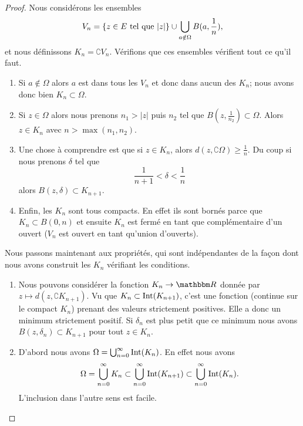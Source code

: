 \begin{proof}
    Nous considérons les ensembles
    \begin{equation}
        V_n=\{ z\in E\text{ tel que } | z | \}\cup\bigcup_{a\notin\Omega}B(a,\frac{1}{ n }),
    \end{equation}
    et nous définissons \( K_n=\complement V_n\). Vérifions que ces ensembles vérifient tout ce qu'il faut.
    \begin{enumerate}
        \item
            Si \( a\notin\Omega\) alors \( a\) est dans tous les \( V_n\) et donc dans aucun des \( K_n\); nous avons donc bien \( K_n\subset\Omega\).
        \item
            Si \( z\in \Omega\) alors nous prenons \( n_1>| z |\) puis \( n_2\) tel que \( B(z,\frac{1}{ n_2 })\subset \Omega\). Alors \( z\in K_n\) avec \( n>\max(n_1,n_2)\).
        \item
            Une chose à comprendre est que si \( z\in K_n\), alors \( d(z,\complement \Omega)\geq \frac{1}{ n }\). Du coup si nous prenons \( \delta\) tel que
            \begin{equation}
                \frac{1}{ n+1 }<\delta<\frac{1}{ n }
            \end{equation}
            alors \( B(z,\delta)\subset K_{n+1}\).
        \item
            Enfin, les \( K_n\) sont tous compacts. En effet ils sont bornés parce que \( K_n\subset B(0,n)\) et ensuite \( K_n\) est fermé en tant que complémentaire d'un ouvert (\( V_n\) est ouvert en tant qu'union d'ouverts).
    \end{enumerate}

    Nous passons maintenant aux propriétés, qui sont indépendantes de la façon dont nous avons construit les \( K_n\) vérifiant les conditions.
    \begin{enumerate}
        \item

            Nous pouvons considérer la fonction \( K_n\to \eR\) donnée par \( z\mapsto d(z,\complement K_{n+1})\). Vu que \( K_n\subset\operatorname{Int}(K_{n+1})\), c'est une fonction (continue sur le compact \( K_n\)) prenant des valeurs strictement positives. Elle a donc un minimum strictement positif. Si \( \delta_n\) est plus petit que ce minimum nous avons \( B(z,\delta_n)\subset K_{n+1}\) pour tout \( z\in K_n\).

        \item

            D'abord nous avons \( \Omega=\bigcup_{n=0}^{\infty}\operatorname{Int}(K_n)\). En effet nous avons
            \begin{equation}
                \Omega=\bigcup_{n=0}^{\infty}K_n\subset\bigcup_{n=0}^{\infty}\operatorname{Int}(K_{n+1})\subset\bigcup_{n=0}^{\infty}\operatorname{Int}(K_n).
            \end{equation}
            L'inclusion dans l'autre sens est facile.


\end{enumerate}
\end{proof}

